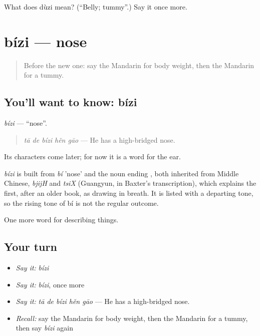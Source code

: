 \begin{tcolorbox}[breakable,colback=teal!4,colframe=teal!35!black,title={Before you move on}]
What does dùzi mean? (\textquotedblleft{}Belly; tummy\textquotedblright{}.) Say it once more.
\end{tcolorbox}
\section[bízi]{bízi — nose}

\label{lesson:ZH-C230-bizi}



\begin{quote}
Before the new one: say the Mandarin for body weight, then the Mandarin for a tummy.
\end{quote}

\subsection*{You'll want to know: bízi}
\emph{bízi} — \textquotedblleft{}nose\textquotedblright{}.

\begin{quote}
\emph{tā de bízi hěn gāo} — He has a high-bridged nose.
\end{quote}

Its characters come later; for now it is a word for the ear.

\begin{cousinweb}
\emph{bízi} is built from \emph{bí} 'nose' and the noun ending , both inherited from Middle Chinese, \emph{bjijH} and \emph{tsiX} (Guangyun, in Baxter's transcription), which explains the first, after an older book, as drawing in breath. It is listed with a departing tone, so the rising tone of bí is not the regular outcome.
\end{cousinweb}

\begin{grammarlens}[title={What you've built}]
One more word for describing things.
\end{grammarlens}

\subsection*{Your turn}
\begin{itemize}
\raggedright
  \item \emph{Say it:} \emph{bízi}
  \item \emph{Say it:} \emph{bízi}, once more
  \item \emph{Say it:} \emph{tā de bízi hěn gāo} — He has a high-bridged nose.
  \item \emph{Recall:} say the Mandarin for body weight, then the Mandarin for a tummy, then say \emph{bízi} again
\end{itemize}

